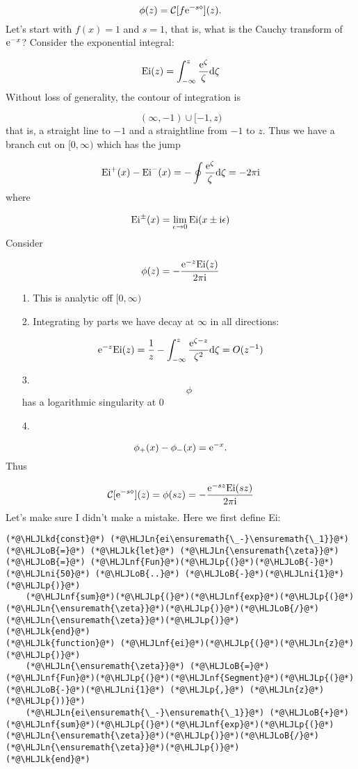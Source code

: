 \documentclass[12pt,landscape]{article}
\newcommand{\HLJLk}[1]{\textcolor[RGB]{148,91,176}{\textbf{#1}}}
\newcommand{\HLJLkd}[1]{\textcolor[RGB]{214,102,97}{\textit{#1}}}
\newcommand{\HLJLn}[1]{#1}
\newcommand{\HLJLnf}[1]{\textcolor[RGB]{66,102,213}{#1}}
\newcommand{\HLJLni}[1]{\textcolor[RGB]{59,151,46}{#1}}
\newcommand{\HLJLoB}[1]{\textcolor[RGB]{102,102,102}{\textbf{#1}}}
\newcommand{\HLJLp}[1]{#1}
\def\D{ {\rm d} }
\def\I{ {\rm i} }
\def\E{ {\rm e} }
\def\CC{ {\cal C} }
\begin{document}
{\[
\phi(z) = \CC[f \E^{-s \diamond}](z).
\]
Let's start with $f(x) = 1$ and $s = 1$, that is, what is the Cauchy transform of $\E^{-x}$? Consider the exponential integral:

\[
{\rm Ei}(z) = \int_{-\infty}^z {\E^\zeta \over \zeta} \D \zeta
\]
Without loss of generality, the contour of integration is

\[
(\infty,-1) \cup [-1, z)
\]
that is, a straight line to $-1$ and a straightline from $-1$ to $z$. Thus we have a branch cut on $[0,\infty)$ which has the jump

\[
{\rm Ei}^+(x) - {\rm Ei}^-(x) = -\oint {\E^\zeta \over \zeta} \D \zeta = -2 \pi \I
\]
where

\[
{\rm Ei}^\pm(x) = \lim_{\epsilon \rightarrow 0} {\rm Ei}(x\pm\I \epsilon)
\]
Consider

\[
\phi(z) = -{\E^{-z} {\rm Ei}(z) \over 2 \pi \I }
\]
\begin{itemize}
\item[1. ] This is analytic off $[0,\infty)$


\item[2. ] Integrating by parts we have decay at $\infty$ in all directions:

\end{itemize}
\[
\E^{-z} {\rm Ei}(z) = {1  \over z}  - \int_{-\infty}^z {\E^{\zeta-z} \over \zeta^2} \D \zeta = O(z^{-1})
\]
\begin{itemize}
\item[3. ] \[
\phi
\]
has a logarithmic singularity at 0


\item[4. ] \end{itemize}
\[
\phi_+(x) - \phi_-(x) = \E^{-x}.
\]
Thus

\[
\CC[ \E^{-s \diamond}](z) = \phi(s z) = - {\E^{-s z} {\rm Ei}(s z)  \over 2 \pi \I}
\]
Let's make sure I didn't make a mistake. Here we first define Ei:


\begin{lstlisting}
(*@\HLJLkd{const}@*) (*@\HLJLn{ei\ensuremath{\_-}\ensuremath{\_1}}@*) (*@\HLJLoB{=}@*) (*@\HLJLk{let}@*) (*@\HLJLn{\ensuremath{\zeta}}@*) (*@\HLJLoB{=}@*) (*@\HLJLnf{Fun}@*)(*@\HLJLp{(}@*)(*@\HLJLoB{-}@*)(*@\HLJLni{50}@*) (*@\HLJLoB{..}@*) (*@\HLJLoB{-}@*)(*@\HLJLni{1}@*)(*@\HLJLp{)}@*)
    (*@\HLJLnf{sum}@*)(*@\HLJLp{(}@*)(*@\HLJLnf{exp}@*)(*@\HLJLp{(}@*)(*@\HLJLn{\ensuremath{\zeta}}@*)(*@\HLJLp{)}@*)(*@\HLJLoB{/}@*)(*@\HLJLn{\ensuremath{\zeta}}@*)(*@\HLJLp{)}@*)
(*@\HLJLk{end}@*)
(*@\HLJLk{function}@*) (*@\HLJLnf{ei}@*)(*@\HLJLp{(}@*)(*@\HLJLn{z}@*)(*@\HLJLp{)}@*)
    (*@\HLJLn{\ensuremath{\zeta}}@*) (*@\HLJLoB{=}@*) (*@\HLJLnf{Fun}@*)(*@\HLJLp{(}@*)(*@\HLJLnf{Segment}@*)(*@\HLJLp{(}@*)(*@\HLJLoB{-}@*)(*@\HLJLni{1}@*) (*@\HLJLp{,}@*) (*@\HLJLn{z}@*)(*@\HLJLp{))}@*)
    (*@\HLJLn{ei\ensuremath{\_-}\ensuremath{\_1}}@*) (*@\HLJLoB{+}@*) (*@\HLJLnf{sum}@*)(*@\HLJLp{(}@*)(*@\HLJLnf{exp}@*)(*@\HLJLp{(}@*)(*@\HLJLn{\ensuremath{\zeta}}@*)(*@\HLJLp{)}@*)(*@\HLJLoB{/}@*)(*@\HLJLn{\ensuremath{\zeta}}@*)(*@\HLJLp{)}@*)
(*@\HLJLk{end}@*)


\end{lstlisting}}
\end{document}
